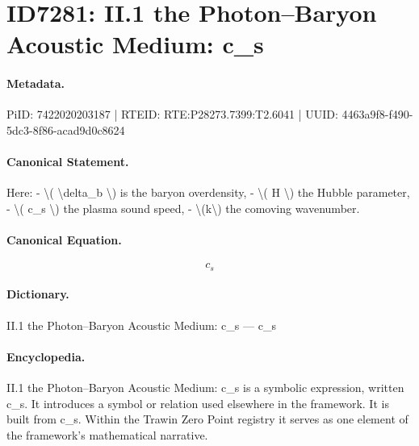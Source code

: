 \section*{ID7281: II.1 the Photon–Baryon Acoustic Medium: c\_s}
\paragraph{Metadata.}
PiID: 7422020203187 | RTEID: RTE:P28273.7399:T2.6041 | UUID: 4463a9f8-f490-5dc3-8f86-acad9d0c8624

\paragraph{Canonical Statement.}
Here: - \textbackslash{}( \textbackslash{}delta\_b \textbackslash{}) is the baryon overdensity, - \textbackslash{}( H \textbackslash{}) the Hubble parameter, - \textbackslash{}( c\_s \textbackslash{}) the plasma sound speed, - \textbackslash{}(k\textbackslash{}) the comoving wavenumber.

\paragraph{Canonical Equation.}
\[
c_s
\]

\paragraph{Dictionary.}
II.1 the Photon–Baryon Acoustic Medium: c\_s — c\_s

\paragraph{Encyclopedia.}
II.1 the Photon–Baryon Acoustic Medium: c\_s is a symbolic expression, written c\_s. It introduces a symbol or relation used elsewhere in the framework. It is built from c\_s. Within the Trawin Zero Point registry it serves as one element of the framework's mathematical narrative.
